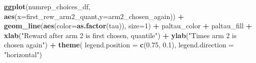 \documentclass[
]{article}
\newenvironment{Shaded}{\begin{snugshade}}{\end{snugshade}}
\newcommand{\AttributeTok}[1]{\textcolor[rgb]{0.13,0.29,0.53}{#1}}
\newcommand{\DecValTok}[1]{\textcolor[rgb]{0.00,0.00,0.81}{#1}}
\newcommand{\FloatTok}[1]{\textcolor[rgb]{0.00,0.00,0.81}{#1}}
\newcommand{\FunctionTok}[1]{\textcolor[rgb]{0.13,0.29,0.53}{\textbf{#1}}}
\newcommand{\NormalTok}[1]{#1}
\newcommand{\SpecialCharTok}[1]{\textcolor[rgb]{0.81,0.36,0.00}{\textbf{#1}}}
\newcommand{\StringTok}[1]{\textcolor[rgb]{0.31,0.60,0.02}{#1}}
\begin{document}
\begin{Shaded}
\begin{Highlighting}[]
\FunctionTok{ggplot}\NormalTok{(numrep\_choices\_df, }\FunctionTok{aes}\NormalTok{(}\AttributeTok{x=}\NormalTok{first\_rew\_arm2\_quant,}\AttributeTok{y=}\NormalTok{arm2\_chosen\_again)) }\SpecialCharTok{+}
  \FunctionTok{geom\_line}\NormalTok{(}\FunctionTok{aes}\NormalTok{(}\AttributeTok{color=}\FunctionTok{as.factor}\NormalTok{(tau)), }\AttributeTok{size=}\DecValTok{1}\NormalTok{) }\SpecialCharTok{+}
\NormalTok{  paltau\_color }\SpecialCharTok{+} 
\NormalTok{  paltau\_fill }\SpecialCharTok{+}
  \FunctionTok{xlab}\NormalTok{(}\StringTok{"Reward after arm 2 is first chosen, quantile"}\NormalTok{) }\SpecialCharTok{+}
  \FunctionTok{ylab}\NormalTok{(}\StringTok{"Times arm 2 is chosen again"}\NormalTok{) }\SpecialCharTok{+}
  \FunctionTok{theme}\NormalTok{(}
    \AttributeTok{legend.position =} \FunctionTok{c}\NormalTok{(}\FloatTok{0.75}\NormalTok{, }\FloatTok{0.1}\NormalTok{),}
    \AttributeTok{legend.direction =} \StringTok{"horizontal"}\NormalTok{)}
\end{Highlighting}
\end{Shaded}
\end{document}

